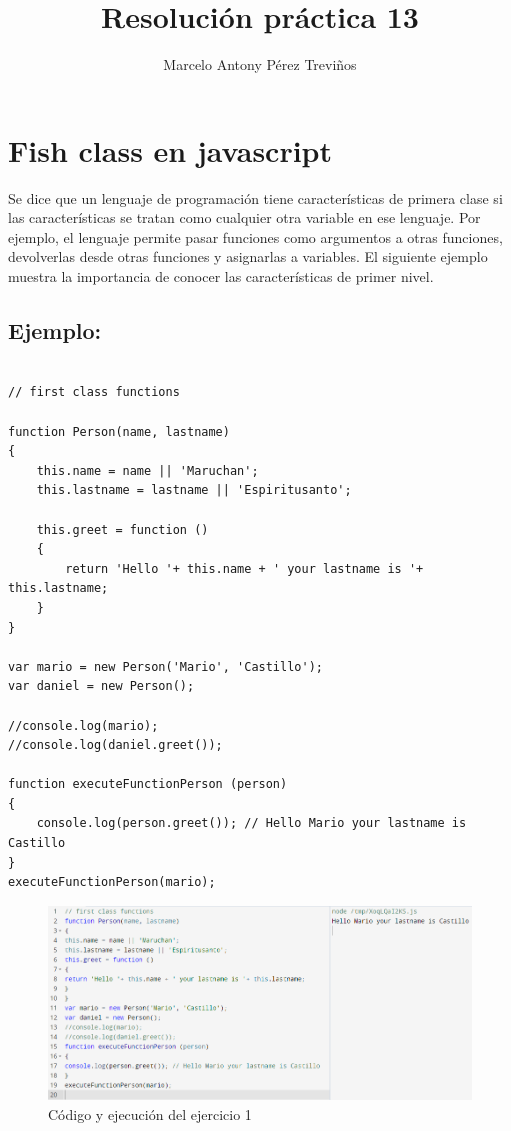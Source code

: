 \documentclass{article}
\title{Resolución práctica 13}
\author{Marcelo Antony Pérez Treviños}
\begin{document}
\maketitle
\section{Fish class en javascript}

Se dice que un lenguaje de programación tiene características de primera clase si las características se tratan como cualquier otra variable en ese lenguaje. Por ejemplo, el lenguaje permite pasar funciones como argumentos a otras funciones, devolverlas desde otras funciones y asignarlas a variables. El siguiente ejemplo muestra la importancia de conocer las características de primer nivel.

\subsection{Ejemplo:}

\begin{verbatim}

// first class functions

function Person(name, lastname)
{
    this.name = name || 'Maruchan';
    this.lastname = lastname || 'Espiritusanto';
    
    this.greet = function ()
    {
        return 'Hello '+ this.name + ' your lastname is '+ this.lastname;
    }
}

var mario = new Person('Mario', 'Castillo');
var daniel = new Person();

//console.log(mario);
//console.log(daniel.greet());

function executeFunctionPerson (person)
{
    console.log(person.greet()); // Hello Mario your lastname is Castillo
}
executeFunctionPerson(mario);

\end{verbatim}

\begin{figure}
\centering
\includegraphics[width=1\textwidth]{ejercicio1.png} 
\caption{\label{fig:frog}Código y ejecución del ejercicio 1}
\end{figure}
\end{document}
